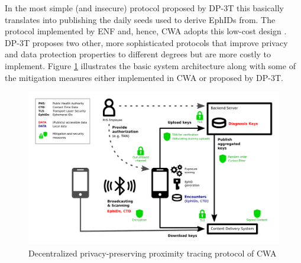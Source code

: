 \documentclass{llncs}
\begin{document}
In the most simple (and insecure) protocol proposed by DP-3T %
this basically translates into publishing the daily seeds used to derive EphIDs from.
The protocol implemented by ENF and,
hence, CWA adopts this low-cost design \cite{cwa:arch}. DP-3T proposes two other, more sophisticated protocols that improve
privacy and data protection properties to different degrees but are more costly to implement.
%
Figure \ref{fig:dp3tprot} illustrates the basic system architecture
along with some of the mitigation measures either implemented in CWA or proposed by DP-3T.
\begin{figure}[htb]
\vspace{-.5cm}
  \begin{center}
    \includegraphics[width=5in]{DP-3T_basic_protocol}
  \end{center}
\vspace{-.5cm}
  \caption{Decentralized privacy-preserving proximity tracing protocol of CWA}
  \label{fig:dp3tprot}
\vspace{-.5cm}
\end{figure}
\end{document}
